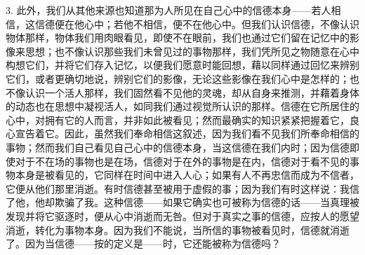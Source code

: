 3. 此外，我们从其他来源也知道那为人所见在自己心中的信德本身——若人相信，这信德便在他心中；若他不相信，便不在他心中。但我们认识信德，不像认识物体那样，物体我们用肉眼看见，即使不在眼前，我们也通过它们留在记忆中的影像来思想；也不像认识那些我们未曾见过的事物那样，我们凭所见之物随意在心中构想它们，并将它们存入记忆，以便我们愿意时能回想，藉以同样通过回忆来辨别它们，或者更确切地说，辨别它们的影像，无论这些影像在我们心中是怎样的；也不像认识一个活人那样，我们固然看不见他的灵魂，却从自身来推测，并藉着身体的动态也在思想中凝视活人，如同我们通过视觉所认识的那样。信德在它所居住的心中，对拥有它的人而言，并非如此被看见；然而最确实的知识紧紧把握着它，良心宣告着它。因此，虽然我们奉命相信这叙述，因为我们看不见我们所奉命相信的事物；然而我们自己看见自己心中的信德本身，当这信德在我们内时；因为信德即使对于不在场的事物也是在场，信德对于在外的事物是在内，信德对于看不见的事物本身是被看见的，它同样在时间中进入人心；如果有人不再忠信而成为不信者，它便从他们那里消逝。有时信德甚至被用于虚假的事；因为我们有时这样说：我信了他，他却欺骗了我。这种信德——如果它确实也可被称为信德的话——当真理被发现并将它驱逐时，便从心中消逝而无咎。但对于真实之事的信德，应按人的愿望消逝，转化为事物本身。因为我们不能说，当所信的事物被看见时，信德就消逝了。因为当信德——按的定义是——时，它还能被称为信德吗？\par

